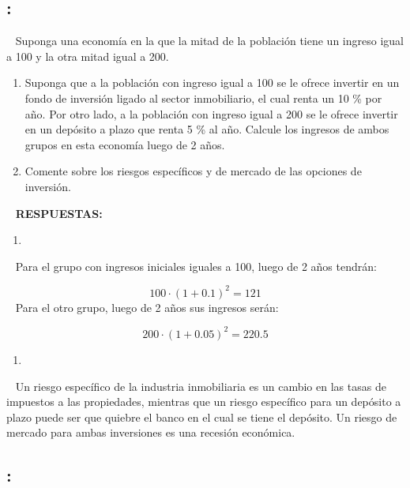 \documentclass[
  letterpaper,
  DIV=11,
  numbers=noendperiod]{scrreport}
\providecommand{\tightlist}{%
  \setlength{\itemsep}{0pt}\setlength{\parskip}{0pt}}\usepackage{longtable,booktabs,array}
\begin{document}
\hypertarget{section-41}{%
\subsection{:}\label{section-41}}

~ Suponga una economía en la que la mitad de la población tiene un
ingreso igual a 100 y la otra mitad igual a 200.

\begin{enumerate}
\def\labelenumi{\alph{enumi})}
\item
  Suponga que a la población con ingreso igual a 100 se le ofrece
  invertir en un fondo de inversión ligado al sector inmobiliario, el
  cual renta un 10 \% por año. Por otro lado, a la población con ingreso
  igual a 200 se le ofrece invertir en un depósito a plazo que renta 5
  \% al año. Calcule los ingresos de ambos grupos en esta economía luego
  de 2 años.
\item
  Comente sobre los riesgos específicos y de mercado de las opciones de
  inversión.
\end{enumerate}

~ \textbf{RESPUESTAS:}

\begin{enumerate}
\def\labelenumi{\alph{enumi})}
\tightlist
\item
\end{enumerate}

~ Para el grupo con ingresos iniciales iguales a 100, luego de 2 años
tendrán:

\[100\cdot(1+0.1)^2=121\] ~ Para el otro grupo, luego de 2 años sus
ingresos serán:

\[200\cdot(1+0.05)^2=220.5\]

\begin{enumerate}
\def\labelenumi{\alph{enumi})}
\setcounter{enumi}{1}
\tightlist
\item
\end{enumerate}

~ Un riesgo específico de la industria inmobiliaria es un cambio en las
tasas de impuestos a las propiedades, mientras que un riesgo específico
para un depósito a plazo puede ser que quiebre el banco en el cual se
tiene el depósito. Un riesgo de mercado para ambas inversiones es una
recesión económica.

\hypertarget{section-42}{%
\subsection{:}\label{section-42}}
\end{document}
